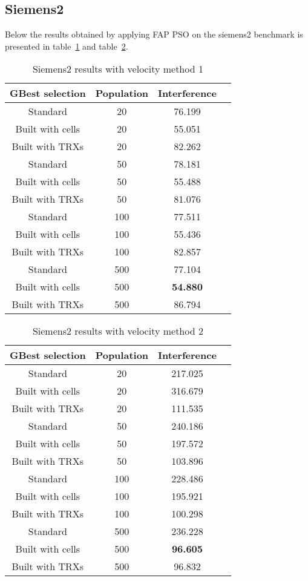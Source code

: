 \subsection{Siemens2}
Below the results obtained by applying FAP PSO on the siemens2 benchmark is presented in table~\ref{tab:siem2m1} and table~\ref{tab:siem2m2}.
\begin{table}[H]
\centering
	\begin{tabular}{| c | c | c | c |}
	\hline
	GBest selection & Population & Interference\\ \hline
	Standard & 20 & 76.199\\ \hline
	Built with cells & 20 & 55.051\\ \hline
	Built with TRXs & 20 & 82.262\\ \hline
	Standard & 50 & 78.181\\ \hline
	Built with cells & 50 & 55.488\\ \hline
	Built with TRXs & 50 & 81.076\\ \hline
	Standard & 100 & 77.511\\ \hline
	Built with cells & 100 & 55.436\\ \hline
	Built with TRXs & 100 & 82.857\\ \hline
	Standard & 500 & 77.104\\ \hline
	Built with cells & 500 & \textbf{54.880}\\ \hline
	Built with TRXs & 500 & 86.794\\ \hline
	\end{tabular}
\caption{Siemens2 results with velocity method 1}
\label{tab:siem2m1}
\end{table}
\begin{table}[H]
\centering
	\begin{tabular}{| c | c | c | c |}
	\hline
	GBest selection & Population & Interference\\ \hline
	Standard & 20 & 217.025\\ \hline
	Built with cells & 20 & 316.679\\ \hline
	Built with TRXs & 20 & 111.535\\ \hline
	Standard & 50 & 240.186\\ \hline
	Built with cells & 50 & 197.572\\ \hline
	Built with TRXs & 50 & 103.896\\ \hline
	Standard & 100 & 228.486\\ \hline
	Built with cells & 100 & 195.921\\ \hline
	Built with TRXs & 100 & 100.298\\ \hline
	Standard & 500 & 236.228\\ \hline
	Built with cells & 500 & \textbf{96.605}\\ \hline
	Built with TRXs & 500 & 96.832\\ \hline
	\end{tabular}
\caption{Siemens2 results with velocity method 2}
\label{tab:siem2m2}
\end{table}
